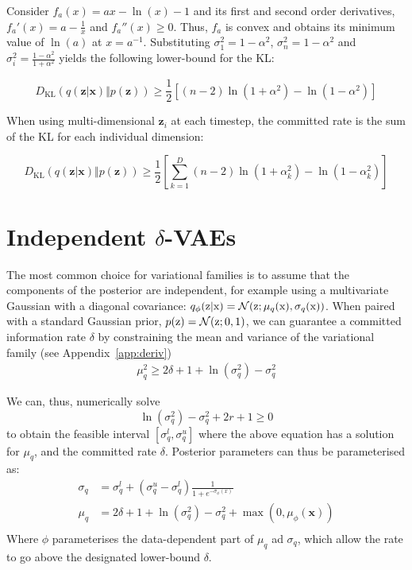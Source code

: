 \documentclass{article} \usepackage{iclr2019_conference,times}
\def\rx{{\textnormal{x}}}
\def\rz{{\textnormal{z}}}
\def\rvx{{\mathbf{x}}}
\def\rvz{{\mathbf{z}}}
\newcommand{\KL}{D_{\mathrm{KL}}}
\newcommand{\aref}[1]{Appendix~\ref{#1}}
\begin{document}
Consider $f_a(x) = ax - \ln(x) - 1$ and its first and second order derivatives, $f_a'(x) = a - \frac{1}{x}$  and $f_a''(x) \ge 0$. Thus, $f_a$ is convex  and obtains its minimum value of $\ln(a)$ at $x = a^{-1}$. Substituting $\sigma_1^2 = 1 - \alpha^2$, $\sigma_n^2 = 1 - \alpha^2$ and $\sigma_i^2 = \frac{1-\alpha^2}{1+\alpha^2}$ yields the following lower-bound for the KL:

\begin{equation*}
\KL(q(\rvz|\rvx) \Vert p(\rvz)) \ge \frac{1}{2}[(n-2)\ln(1+\alpha^2) - \ln(1-\alpha^2)]
\end{equation*}

When using multi-dimensional $\rvz_i$ at each timestep, the committed rate is the sum of the KL for each individual dimension:

\begin{equation*}
    \KL(q(\rvz|\rvx) \Vert p(\rvz)) \ge \frac{1}{2}[ \sum_{k=1}^{D}(n-2)\ln(1+\alpha_k^2) - \ln(1-\alpha_k^2)]
\end{equation*}





\section{Independent $\delta$-VAEs}
\label{app:indep}
 The most common choice for variational families is to assume that the components of the posterior are independent, for example using a multivariate Gaussian with a diagonal covariance: $q_\phi(\rz|\rx) = \mathcal{N}(\rz;\mu_q(\rx), \sigma_q(\rx))$. When paired with a standard Gaussian prior, $p(\rz) = \mathcal{N}(\rz; 0, 1)$, we can guarantee a committed information rate  $\delta$ by constraining the mean and variance of the variational family (see \aref{app:deriv})
 \begin{equation}
     \begin{aligned}
       \mu_q^2 \ge 2\delta + 1 + \ln(\sigma_q^2) - \sigma_q^2
     \end{aligned}
 \end{equation}

We can, thus, numerically solve 
\[\ln(\sigma_q^2) - \sigma_q^2 + 2r +1 \ge 0\]
to obtain the feasible interval $[\sigma_q^l, \sigma_q^u]$ where the above equation has a solution for $\mu_q$, and the committed rate $\delta$. Posterior parameters can thus be parameterised as:
\begin{align}
    \sigma_q &= \sigma_q^l + (\sigma_q^u - \sigma_q^l) \frac{1}{1 + e^{-\sigma_\phi(x)}}\\
    \mu_q &= 2\delta + 1 + \ln(\sigma_q^2) - \sigma_q^2 + \max(0, \mu_\phi(\rvx))\\
\end{align}
Where $\phi$ parameterises the data-dependent part of $\mu_q$ ad $\sigma_q$, which allow the rate to go above the designated lower-bound $\delta$. 
\end{document}
